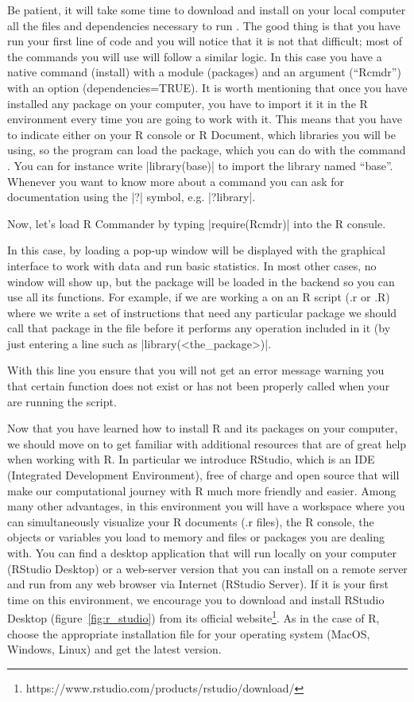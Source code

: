 Be patient, it will take some time to download and install on your
local computer all the files and dependencies necessary to run . The good thing is that you have run your first line of
code and you will notice that it is not that difficult; most of the
commands you will use will follow a similar logic. In this case you
have a native command (install) with a module (packages) and an
argument (``Rcmdr'') with an option (dependencies=TRUE). It is worth
mentioning that once you have installed any package on your computer,
you have to import it it in the R environment every time you are going
to work with it. This means that you have to indicate either on your R
console or R Document, which libraries you will be using, so the
program can load the package, which you can do with the command
. You can for instance write |library(base)| to import
the library named ``base''. Whenever you want to know more about a
command you can ask for documentation using the |?| symbol,
e.g. |?library|.

Now, let’s load R Commander by typing |require(Rcmdr)| into the R consule.

In this case, by loading  a pop-up window will be displayed
with the graphical interface to work with data and run basic
statistics. In most other cases, no window will show up, but the
package will be loaded in the backend so you can use all its
functions. For example, if we are working a on an R script (.r or .R)
where we write a set of instructions that need any particular package
we should call that package in the file before it performs any
operation included in it (by just entering a line such as
|library(<the_package>)|.

With this line you ensure that you will not get an error message
warning you that certain function does not exist or has not been
properly called when your are running the script.

Now that you have learned how to install R and its packages on your
computer, we should move on to get familiar with additional resources
that are of great help when working with R. In particular we introduce
RStudio, which is an IDE (Integrated Development Environment),
free of charge and open source that will
make our computational journey with R much more friendly and
easier. Among many other advantages, in this environment you will have
a workspace where you can simultaneously visualize your R documents
(.r files), the R console, the objects or variables you load to memory
and files or packages you are dealing with. You can find a desktop
application that will run locally on your computer (RStudio Desktop)
or a web-server version that you can install on a remote server and
run from any web browser via Internet (RStudio Server). If it is your
first time on this environment, we encourage you to download and
install RStudio Desktop (figure~\ref{fig:r_studio}) from its official
website\footnote{https://www.rstudio.com/products/rstudio/download/}. As
in the case of R, choose the appropriate installation file for
your operating system (MacOS, Windows, Linux) and get the latest
version.

